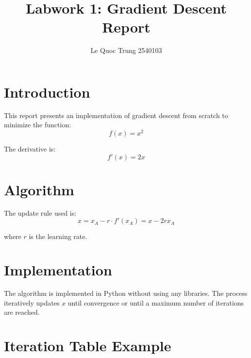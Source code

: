 \documentclass{article}
\title{Labwork 1: Gradient Descent Report}
\author{Le Quoc Trung 2540103}
\date{}
\begin{document}
\maketitle

\section{Introduction}
This report presents an implementation of gradient descent from scratch to minimize the function:
\[
f(x) = x^2
\]

The derivative is:
\[
f'(x) = 2x
\]

\section{Algorithm}
The update rule used is:
\[
x = x_A - r \cdot f'(x_A) = x - 2rx_A
\]

where $r$ is the learning rate.

\section{Implementation}
The algorithm is implemented in Python without using any libraries. The process iteratively updates $x$ until convergence or until a maximum number of iterations are reached.

\section{Iteration Table Example}
\end{document}
